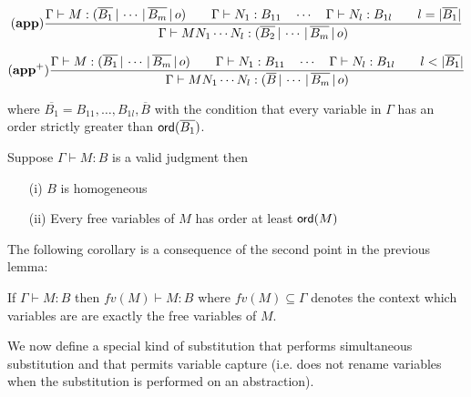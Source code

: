 $$ \mathbf{(app)} \frac{\displaystyle {{{\Gamma} \vdash {M : (\overline{B_1} \, | \, \cdots \, | \, \overline{B_m} \, | \, o)}} \qquad
{{\Gamma} \vdash {N_1 : B_{11}}} \quad \cdots \quad {{\Gamma} \vdash {N_{l} :
B_{1l}}} \qquad l = |\overline{B_1}| }}{ {{\Gamma} \vdash {M N_1
\cdots N_{l} : (\overline{B_2} \, | \, \cdots \, | \,
\overline{B_m} \, | \, o)}}} $$


$$ \mathbf{(app^+)} \frac{\displaystyle {{\Gamma} \vdash {M : (\overline{B_1} \, | \, \cdots \, | \, \overline{B_m} \, | \, o)}} \qquad
    {{\Gamma} \vdash {N_1 : B_{11}}} \quad \cdots \quad {{\Gamma} \vdash {N_{l} :
    B_{1l}}} \qquad l < |\overline{B_1}| }{ {{\Gamma} \vdash {M N_1
    \cdots N_{l} : (\overline{B} \, | \, \cdots \, | \,
    \overline{B_m} \, | \, o)}}} $$

where $\overline{B_1} = B_{11}, \ldots, B_{1l},\overline{B}$ with
the condition that every variable in $\Gamma$ has an order strictly greater
than ${\sf ord}(\overline{B_1})$.


\begin{lem}
\label{lem:safe_basic_prop} Suppose $\Gamma \vdash M : B$ is a
valid judgment then
\begin{itemize}
\item[(i)] $B$ is homogeneous
\item[(ii)] Every free variables of $M$ has order at least ${\sf ord}(M)$
\end{itemize}
\end{lem}

The following corollary is a consequence of the second point in the previous lemma:
\begin{property}
If $\Gamma \vdash M : B$ then $fv(M) \vdash M : B$ where $fv(M) \subseteq \Gamma$ denotes the context which variables are
are exactly the free variables of $M$.
\end{property}

We now define a special kind of substitution that performs simultaneous substitution and
that permits variable capture (i.e. does not rename variables when the substitution is performed on an abstraction).

